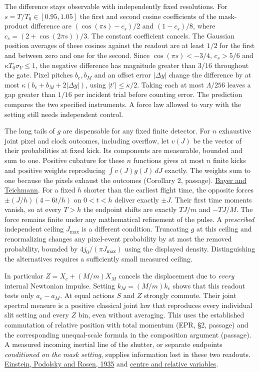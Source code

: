 \documentclass[11pt,a4paper]{article}
\begin{document}
The difference stays observable with independently fixed resolutions.
For \(s=T/T_0\in[0.95,1.05]\) the first and second cosine coefficients
of the mask-product difference are \((\cos(\pi s)-c_s)/2\) and
\((1-c_s)/8\), where \(c_s=(2+\cos(2\pi s))/3\). The constant
coefficient cancels. The Gaussian position averages of these cosines
against the readout are at least \(1/2\) for the first and between zero
and one for the second. Since \(\cos(\pi s)<-3/4\), \(c_s>5/6\) and
\(\kappa T_0\sigma_V\le1\), the negative difference has magnitude
greater than \(3/16\) throughout the gate. Pixel pitches \(b_e,b_M\) and
an offset error \(|\Delta y|\) change the difference by at most
\(\kappa(b_e+b_M+2|\Delta y|)\), using \(|t'|\le\kappa/2\). Taking each
at most \(\Lambda/256\) leaves a gap greater than \(1/16\) per incident
trial before counting error. The prediction compares the two specified
instruments. A force law allowed to vary with the setting still needs
independent control.

The long tails of \(g\) are dispensable for any fixed finite detector.
For \(n\) exhaustive joint pixel and clock outcomes, including overflow,
let \(v(J)\) be the vector of their probabilities at fixed kick. Its
components are measurable, bounded and sum to one. Positive cubature for
these \(n\) functions gives at most \(n\) finite kicks and positive
weights reproducing \(\int v(J)g(J)\,dJ\) exactly. The weights sum to
one because the pixels exhaust the outcomes (Corollary 2, passage).
\href{https://www.wias-berlin.de/people/bayerc/files/tchakaloff.pdf}{Bayer
and Teichmann}. For a fixed \(h\) shorter than the earliest flight time,
the opposite forces \(\pm(J/h)(4-6t/h)\) on \(0<t<h\) deliver exactly
\(\pm J\). Their first time moments vanish, so at every \(T>h\) the
endpoint shifts are exactly \(TJ/m\) and \(-TJ/M\). The force remains
finite under any mathematical refinement of the pulse. A
\emph{prescribed} independent ceiling \(J_{\max}\) is a different
condition. Truncating \(g\) at this ceiling and renormalizing changes
any pixel-event probability by at most the removed probability, bounded
by \(4j_0/(\pi J_{\max})\) using the displayed density. Distinguishing
the alternatives requires a sufficiently small measured ceiling.

In particular \(Z=X_e+(M/m)X_M\) cancels the displacement due to
\emph{every} internal Newtonian impulse. Setting \(k_M=(M/m)k_e\) shows
that this readout tests only \(a_e-a_M\). At equal actions \(S\) and
\(Z\) strongly commute. Their joint spectral measure is a positive
classical joint law that reproduces every individual slit setting and
every \(Z\) bin, even without averaging. This uses the established
commutation of relative position with total momentum (EPR, §2, passage)
and the corresponding unequal-scale formula in the composition argument
(passage). A measured incoming inertial line of the shutter, or separate
endpoints \emph{conditioned on the mask setting}, supplies information
lost in these two readouts.
\href{https://doi.org/10.1103/PhysRev.47.777}{Einstein, Podolsky and
Rosen, 1935} and
\href{rotation-composition-universality.md\#relation-to-fluctuation-composition-and-dimensional-selection}{centre
and relative variables}.
\end{document}
